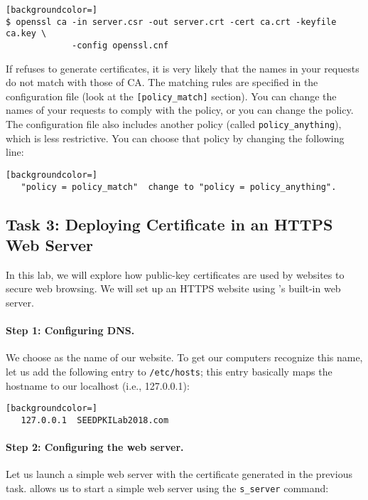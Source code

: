 \begin{lstlisting}[backgroundcolor=]
$ openssl ca -in server.csr -out server.crt -cert ca.crt -keyfile ca.key \
             -config openssl.cnf
\end{lstlisting}


If \OpenSSL refuses to generate certificates, it is very likely that
the names in your requests do not match with those of CA. The matching
rules are specified in the configuration file (look at 
the \texttt{[policy\_match]} section). You can change the names of your 
requests to comply with the policy, or you can change the 
policy.  The configuration file 
also includes another policy (called \texttt{policy\_anything}), 
which is less restrictive. You can choose that policy by
changing the following line: 

\begin{lstlisting}[backgroundcolor=]
   "policy = policy_match"  change to "policy = policy_anything".
\end{lstlisting} 



\subsection{Task 3: Deploying Certificate in an HTTPS Web Server}

In this lab, we will explore how public-key certificates 
are used by websites to secure web browsing. We will set up
an HTTPS website using \openssl's built-in web server. 


\paragraph{Step 1: Configuring DNS.}
We choose \pkiserver as the name of our website.
To get our computers recognize this name,
let us add the following entry to \texttt{/etc/hosts}; this entry
basically maps the hostname \pkiserver to 
our localhost (i.e., 127.0.0.1):

   
\begin{lstlisting}[backgroundcolor=]
   127.0.0.1  SEEDPKILab2018.com
\end{lstlisting}


\paragraph{Step 2: Configuring the web server.}
Let us launch a simple web server with the certificate 
generated in the previous task. \OpenSSL allows us 
to start a simple web server using the \texttt{s\_server} command: 

